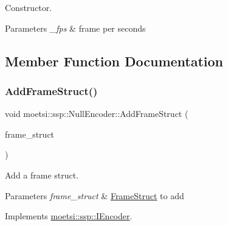 Constructor. 


\begin{DoxyParams}{Parameters}
{\em \+\_\+fps} & frame per seconds \\
\hline
\end{DoxyParams}


\subsection{Member Function Documentation}
\mbox{\label{classmoetsi_1_1ssp_1_1NullEncoder_a05f90c640c372d00f45173ec3e9436be}} 
\subsubsection{\texorpdfstring{Add\+Frame\+Struct()}{AddFrameStruct()}}
{\footnotesize\ttfamily void moetsi\+::ssp\+::\+Null\+Encoder\+::\+Add\+Frame\+Struct (\begin{DoxyParamCaption}\item[{std\+::shared\+\_\+ptr$<$ \hyperlink{structmoetsi_1_1ssp_1_1FrameStruct}{Frame\+Struct} $>$ \&}]{frame\+\_\+struct }\end{DoxyParamCaption})\hspace{0.3cm}{\ttfamily [virtual]}}



Add a frame struct. 


\begin{DoxyParams}{Parameters}
{\em frame\+\_\+struct} & \hyperlink{structmoetsi_1_1ssp_1_1FrameStruct}{Frame\+Struct} to add \\
\hline
\end{DoxyParams}


Implements \hyperlink{classmoetsi_1_1ssp_1_1IEncoder_a8c223ec82fdd30ee8ee75157306054ec}{moetsi\+::ssp\+::\+I\+Encoder}.

\mbox{\label{classmoetsi_1_1ssp_1_1NullEncoder_ae48926f99c368849ee8822aed10ac1b5}} 
